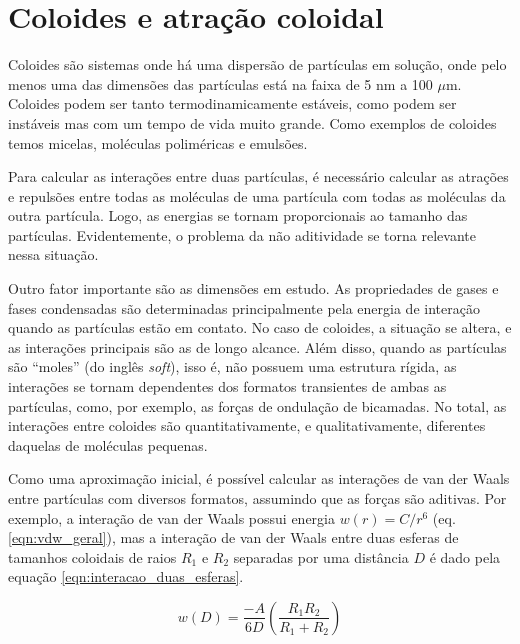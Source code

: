 	\section{Coloides e atração coloidal} 
	\label{sec:coloides_atracao_coloidal}
	Coloides são sistemas onde há uma dispersão de partículas em solução, onde pelo menos uma das dimensões das partículas está na faixa de 5 nm a 100 \(\mu\)m. Coloides podem ser tanto termodinamicamente estáveis, como podem ser instáveis mas com um tempo de vida muito grande. Como exemplos de coloides temos micelas, moléculas poliméricas e emulsões. %
	
	Para calcular as interações entre duas partículas, é necessário calcular as atrações e repulsões entre todas as moléculas de uma partícula com todas as moléculas da outra partícula. Logo, as energias se tornam proporcionais ao tamanho das partículas. Evidentemente, o problema da não aditividade se torna relevante nessa situação. 
	
	Outro fator importante são as dimensões em estudo. As propriedades de gases e fases condensadas são determinadas principalmente pela energia de interação quando as partículas estão em contato. No caso de coloides, a situação se altera, e as interações principais são as de longo alcance. Além disso, quando as partículas são ``moles'' (do inglês \emph{soft}), isso é, não possuem uma estrutura rígida, as interações se tornam dependentes dos formatos transientes de ambas as partículas, como, por exemplo, as forças de ondulação de bicamadas. No total, as interações entre coloides são quantitativamente, e qualitativamente, diferentes daquelas de moléculas pequenas. %
	
	Como uma aproximação inicial, é possível calcular as interações de van der Waals entre partículas com diversos formatos, assumindo que as forças são aditivas. Por exemplo, a interação de van der Waals possui energia \(w(r) = C/r^6\) (eq. \ref{eqn:vdw_geral}), mas a interação de van der Waals entre duas esferas de tamanhos coloidais de raios \(R_1\) e \(R_2\) separadas por uma distância \(D\) é dado pela equação \ref{eqn:interacao_duas_esferas}. 
	
	\begin{equation}
		w(D) = \dfrac{-A}{6D} \left( \dfrac{R_1R_2}{R_1 + R_2}   \right)
		\label{eqn:interacao_duas_esferas}
	\end{equation}
	
